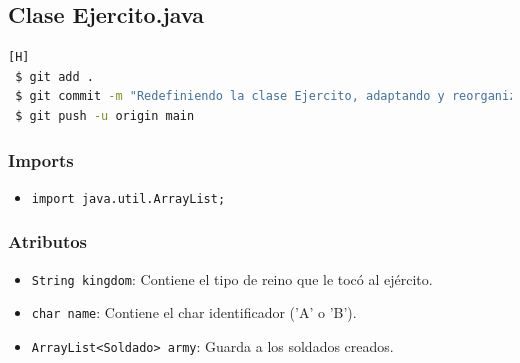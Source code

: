 \documentclass{article}
\begin{document}

\subsection{Clase Ejercito.java}
\begin{lstlisting}[language=bash,caption={Commit \href{https://github.com/hernanchoquehuanca/fp2-23b/commit/94bd50accf6a9c7aaf3aebd286fbfba93da2e5d8}{94bd50a}: Redefiniendo la clase Ejercito, adaptando y reorganizando su contenido}][H]
 $ git add .
 $ git commit -m "Redefiniendo la clase Ejercito, adaptando y reorganizando su contenido"			
 $ git push -u origin main
\end{lstlisting}
\subsubsection{Imports}
\begin{itemize}
    \item \texttt{import java.util.ArrayList;}
\end{itemize}


\subsubsection{Atributos}
\begin{itemize}
    \item \texttt{String kingdom}: Contiene el tipo de reino que le tocó al ejército.
    \item \texttt{char name}: Contiene el char identificador ('A' o 'B').
    \item \texttt{ArrayList<Soldado> army}: Guarda a los soldados creados.
\end{itemize}

\end{document}
